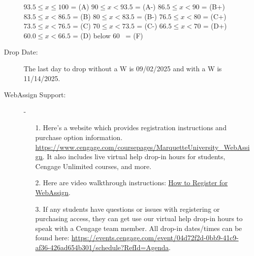 \documentclass[10pt]{article}
\begin{document}
\begin{description}
\hspace*{7.5mm} $93.5\leq x\leq 100$\hspace*{2.9mm}  = (A) \hspace*{10mm} $90\leq x<93.5$ = (A-) \hspace*{10mm} $86.5\leq x<90$ = (B+)\\
\hspace*{7.5mm} $83.5\leq x<86.5$\hspace*{2mm} = (B) \hspace*{10mm} $80\leq x<83.5$ = (B-) \hspace*{10mm} $76.5\leq x<80$ = (C+)\\
\hspace*{7.5mm} $73.5\leq x<76.5$\hspace*{2mm} = (C) \hspace*{10mm} $70\leq x<73.5$ = (C-) \hspace*{10mm} $66.5\leq x<70$ = (D+)\\
\hspace*{7.5mm} $60.0\leq x<66.5$\hspace*{2mm} = (D) \hspace*{10mm} below $60$ \hspace*{5mm}  \ = (F)\vspace{-.05in}

\item[Drop Date:] The last day to drop without a W is 09/02/2025 and with a W is 11/14/2025.

\item[WebAssign Support:] - 
\begin{enumerate}
\item[1.] Here’s a website which provides registration instructions and purchase option information. \url{https://www.cengage.com/coursepages/MarquetteUniversity_WebAssign}. 
It also includes live virtual help drop-in hours for students, Cengage Unlimited courses, and more.
\item[2.] Here are video walkthrough instructions: \href{https://startstrong.cengage.com/webassign-not-integrated-ia-no/}{How to Register for WebAssign}.
\item[3.] If any students have questions or issues with registering or purchasing access, they can get use our virtual help drop-in hours to speak with a Cengage team member. All drop-in dates/times can be found here: \url{https://events.cengage.com/event/04d72f2d-0bb9-41c9-af36-426ad654b301/schedule?RefId=Agenda}.
\end{enumerate}


\end{description}
\end{document}

